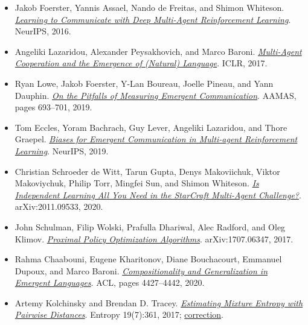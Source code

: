 \begin{itemize}
\tightlist
\item
  Jakob Foerster, Yannis Assael, Nando de Freitas, and Shimon Whiteson.
  \href{https://arxiv.org/abs/1605.06676}{\emph{Learning to Communicate
  with Deep Multi-Agent Reinforcement Learning}}. NeurIPS, 2016.
\item
  Angeliki Lazaridou, Alexander Peysakhovich, and Marco Baroni.
  \href{https://arxiv.org/abs/1612.07182}{\emph{Multi-Agent Cooperation
  and the Emergence of (Natural) Language}}. ICLR, 2017.
\item
  Ryan Lowe, Jakob Foerster, Y-Lan Boureau, Joelle Pineau, and Yann
  Dauphin.
  \href{https://ifaamas.org/Proceedings/aamas2019/pdfs/p693.pdf}{\emph{On
  the Pitfalls of Measuring Emergent Communication}}. AAMAS, pages
  693--701, 2019.
\item
  Tom Eccles, Yoram Bachrach, Guy Lever, Angeliki Lazaridou, and Thore
  Graepel. \href{https://arxiv.org/abs/1912.05676}{\emph{Biases for
  Emergent Communication in Multi-agent Reinforcement Learning}}.
  NeurIPS, 2019.
\item
  Christian Schroeder de Witt, Tarun Gupta, Denys Makoviichuk, Viktor
  Makoviychuk, Philip Torr, Mingfei Sun, and Shimon Whiteson.
  \href{https://arxiv.org/abs/2011.09533}{\emph{Is Independent Learning
  All You Need in the StarCraft Multi-Agent Challenge?}}.
  arXiv:2011.09533, 2020.
\item
  John Schulman, Filip Wolski, Prafulla Dhariwal, Alec Radford, and Oleg
  Klimov. \href{https://arxiv.org/abs/1707.06347}{\emph{Proximal Policy
  Optimization Algorithms}}. arXiv:1707.06347, 2017.
\item
  Rahma Chaabouni, Eugene Kharitonov, Diane Bouchacourt, Emmanuel
  Dupoux, and Marco Baroni.
  \href{https://aclanthology.org/2020.acl-main.407/}{\emph{Compositionality
  and Generalization in Emergent Languages}}. ACL, pages 4427--4442,
  2020.
\item
  Artemy Kolchinsky and Brendan D. Tracey.
  \href{https://www.mdpi.com/1099-4300/19/7/361}{\emph{Estimating
  Mixture Entropy with Pairwise Distances}}. Entropy 19(7):361, 2017;
  \href{https://www.mdpi.com/1099-4300/19/11/588}{correction}.
\end{itemize}
